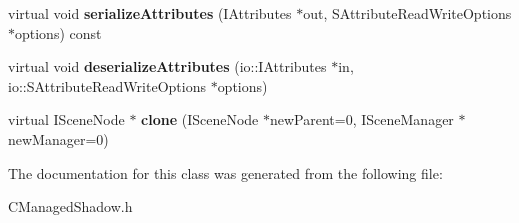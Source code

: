 \begin{DoxyCompactItemize}
\item 
\hypertarget{class_c_managed_shadow_ac7aeb3944e4e1fc49c6b2d9251041fbf}{
virtual void {\bfseries serializeAttributes} (IAttributes $\ast$out, SAttributeReadWriteOptions $\ast$options) const }
\label{class_c_managed_shadow_ac7aeb3944e4e1fc49c6b2d9251041fbf}

\item 
\hypertarget{class_c_managed_shadow_ae8714d824268a296712165eed56f9463}{
virtual void {\bfseries deserializeAttributes} (io::IAttributes $\ast$in, io::SAttributeReadWriteOptions $\ast$options)}
\label{class_c_managed_shadow_ae8714d824268a296712165eed56f9463}

\item 
\hypertarget{class_c_managed_shadow_a0d907c05e1a22343b607c0bba793eae2}{
virtual ISceneNode $\ast$ {\bfseries clone} (ISceneNode $\ast$newParent=0, ISceneManager $\ast$newManager=0)}
\label{class_c_managed_shadow_a0d907c05e1a22343b607c0bba793eae2}

\end{DoxyCompactItemize}


The documentation for this class was generated from the following file:\begin{DoxyCompactItemize}
\item 
CManagedShadow.h\end{DoxyCompactItemize}
